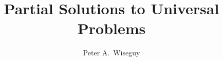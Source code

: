 \documentclass[master,english]{hgbthesis}
\title{Partial Solutions to Universal Problems}
\author{Peter A.\ Wiseguy}
\begin{document}

\frontmatter							%

\maketitle
\tableofcontents


			

\mainmatter          			%










\appendix                                         %


\MakeBibliography                        				%



\end{document}
